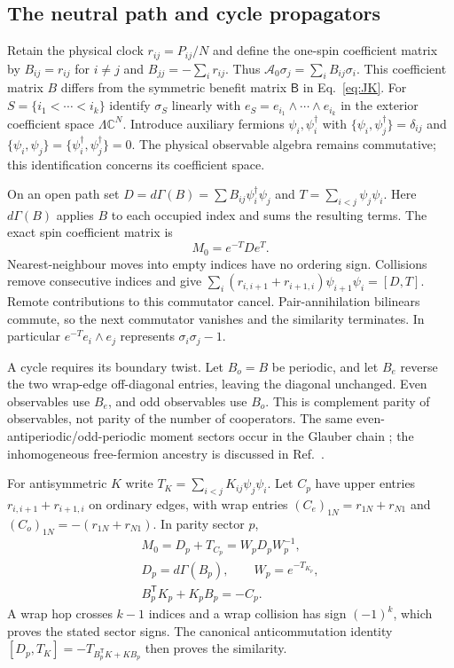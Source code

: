 \documentclass[aps,pre,reprint,amsmath,amssymb,longbibliography]{revtex4-2}
\begin{document}
\subsection{The neutral path and cycle propagators}
\label{app:v3-neutral-cas}

Retain the physical clock $r_{ij}=P_{ij}/N$ and define the one-spin
coefficient matrix by $B_{ij}=r_{ij}$ for $i\ne j$ and
$B_{jj}=-\sum_i r_{ij}$. Thus
$\mathcal A_0\sigma_j=\sum_iB_{ij}\sigma_i$. This coefficient matrix
$B$ differs from the symmetric benefit matrix $\mathsf B$ in Eq.~\eqref{eq:JK}.
For $S=\{i_1<\cdots<i_k\}$ identify
$\sigma_S$ linearly with $e_S=e_{i_1}\wedge\cdots\wedge e_{i_k}$
in the exterior coefficient space $\Lambda\mathbb C^N$.
Introduce auxiliary fermions $\psi_i,\psi_i^\dagger$ with
$\{\psi_i,\psi_j^\dagger\}=\delta_{ij}$ and
$\{\psi_i,\psi_j\}=\{\psi_i^\dagger,\psi_j^\dagger\}=0$.
The physical observable algebra remains commutative; this identification
concerns its coefficient space.

On an open path set $D=d\Gamma(B)=\sum B_{ij}\psi_i^\dagger\psi_j$ and
$T=\sum_{i<j}\psi_j\psi_i$. Here $d\Gamma(B)$ applies $B$ to each
occupied index and sums the resulting terms. The exact spin coefficient matrix is
\begin{equation}
 M_0=e^{-T}De^T.
 \label{eq:v3-path-intertwiner}
\end{equation}
Nearest-neighbour moves into empty indices have no ordering sign.
Collisions remove consecutive indices and give
$\sum_i(r_{i,i+1}+r_{i+1,i})\psi_{i+1}\psi_i=[D,T]$.
Remote contributions to this commutator cancel. Pair-annihilation
bilinears commute, so the next commutator vanishes and the similarity
terminates. In particular $e^{-T}e_i\wedge e_j$ represents
$\sigma_i\sigma_j-1$.

A cycle requires its boundary twist. Let $B_o=B$ be periodic, and
let $B_e$ reverse the two wrap-edge off-diagonal entries, leaving the
diagonal unchanged. Even observables use $B_e$, and odd observables use
$B_o$. This is complement parity of observables, not parity of the
number of cooperators. The same even-antiperiodic/odd-periodic moment
sectors occur in the Glauber chain \cite{MayerSollich2004}; the
inhomogeneous free-fermion ancestry is discussed in
Ref.~\cite{GarrodEtAl2018}.

For antisymmetric $K$ write $T_K=\sum_{i<j}K_{ij}\psi_j\psi_i$.
Let $C_p$ have upper entries $r_{i,i+1}+r_{i+1,i}$ on ordinary edges,
with wrap entries $(C_e)_{1N}=r_{1N}+r_{N1}$ and
$(C_o)_{1N}=-(r_{1N}+r_{N1})$. In parity sector $p$,
\begin{equation}
 \begin{gathered}
 M_0=D_p+T_{C_p}=W_pD_pW_p^{-1},\\
 D_p=d\Gamma(B_p),\qquad W_p=e^{-T_{K_p}},\\
 B_p^{\mathsf T}K_p+K_pB_p=-C_p.
 \end{gathered}
 \label{eq:v3-cycle-intertwiner}
\end{equation}
A wrap hop crosses $k-1$ indices and a wrap collision has sign $(-1)^k$,
which proves the stated sector signs. The canonical anticommutation identity
$[D_p,T_K]=-T_{B_p^{\mathsf T}K+KB_p}$ then proves the similarity.
\end{document}
